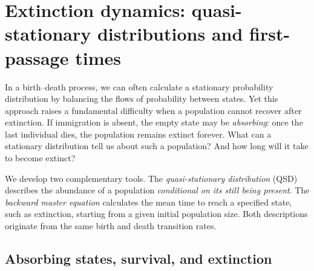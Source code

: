 \section{Extinction dynamics: quasi-stationary distributions and first-passage times}
\label{sec:extinction-qsd-mfpt}

In a birth--death process, we can often calculate a stationary probability
 distribution by balancing the flows of probability between states. Yet this
approach raises a fundamental difficulty when a population cannot recover after
extinction. If immigration is absent, the empty state may be \emph{absorbing}:
once the last individual dies, the population remains extinct forever. What
can a stationary distribution tell us about such a population? And how long
will it take to become extinct?

We develop two complementary tools. The \emph{quasi-stationary distribution}
(QSD) describes the abundance of a population \emph{conditional on its still
being present}. The \emph{backward master equation} calculates the mean time
to reach a specified state, such as extinction, starting from a given initial
population size. Both descriptions originate from the same birth and death
transition rates.

\subsection{Absorbing states, survival, and extinction}
\label{subsec:absorbing-extinction}


